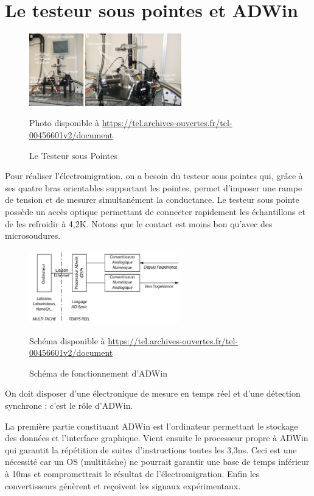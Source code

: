 \section{Le testeur sous pointes et ADWin}
\begin{figure}[h]
    \begin{center}
        \includegraphics[width=250px]{Images/ADWin_avec_legendes}
        \caption{Le Testeur sous Pointes}
        \label{fig:}
        Photo disponible à \url{https://tel.archives-ouvertes.fr/tel-00456601v2/document}
    \end{center}
\end{figure}
Pour réaliser l'électromigration, on a besoin du testeur sous pointes qui, grâce à ses quatre bras orientables supportant les pointes, permet d'imposer une rampe de tension et de mesurer simultanément la conductance. Le testeur sous pointe possède un accès optique permettant de connecter rapidement les échantillons et de les refroidir à 4,2K. Notons que le contact est moins bon qu'avec des microsoudures. 
\begin{figure}[h]
    \begin{center}
        \includegraphics[width=250px]{Images/ADWin_schema}
        \caption{Schéma de fonctionnement d'ADWin}
        \label{fig:}
        Schéma disponible à \url{https://tel.archives-ouvertes.fr/tel-00456601v2/document}
    \end{center}
\end{figure}

On doit disposer d'une électronique de mesure en temps réel et d'une détection synchrone : c'est le rôle d'ADWin.

La première partie constituant ADWin est l'ordinateur permettant le stockage des données et l'interface graphique. Vient ensuite le processeur propre à ADWin qui garantit la répétition de suites d'instructions toutes les 3,3ns. Ceci est une nécessité car un OS (multitâche) ne pourrait garantir une base de temps inférieur à 10ms et compromettrait le résultat de l'électromigration. Enfin les convertisseurs génèrent et reçoivent les signaux expérimentaux.

